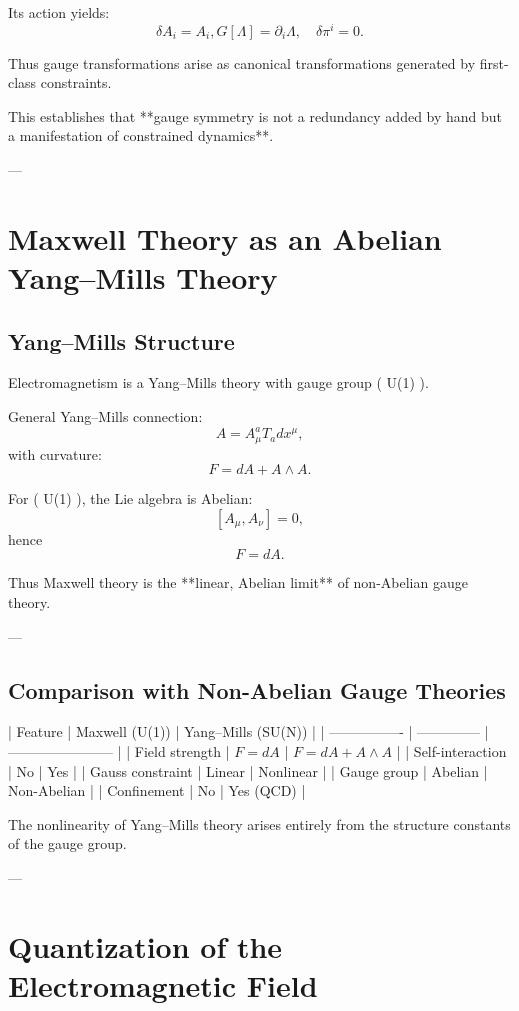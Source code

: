 \documentclass[12pt]{article}
\begin{document}
Its action yields:
\[
\delta A_i = { A_i, G[\Lambda] } = \partial_i \Lambda,
\quad
\delta \pi^i = 0.
\]

Thus gauge transformations arise as canonical transformations generated by first-class constraints.

This establishes that **gauge symmetry is not a redundancy added by hand but a manifestation of constrained dynamics**.

---

\section{Maxwell Theory as an Abelian Yang–Mills Theory}

\subsection{Yang–Mills Structure}

Electromagnetism is a Yang–Mills theory with gauge group ( U(1) ).

General Yang–Mills connection:
\[
A = A_\mu^a T_a dx^\mu,
\]
with curvature:
\[
F = dA + A \wedge A.
\]

For ( U(1) ), the Lie algebra is Abelian:
\[
[A_\mu, A_\nu] = 0,
\]
hence
\[
F = dA.
\]

Thus Maxwell theory is the **linear, Abelian limit** of non-Abelian gauge theory.

---

\subsection{Comparison with Non-Abelian Gauge Theories}

| Feature          | Maxwell (U(1)) | Yang–Mills (SU(N))      |
| ---------------- | -------------- | ----------------------- |
| Field strength   | $ F = dA $     | $ F = dA + A \wedge A $ |
| Self-interaction | No             | Yes                     |
| Gauss constraint | Linear         | Nonlinear               |
| Gauge group      | Abelian        | Non-Abelian             |
| Confinement      | No             | Yes (QCD)               |

The nonlinearity of Yang–Mills theory arises entirely from the structure constants of the gauge group.

---

\section{Quantization of the Electromagnetic Field}
\end{document}
